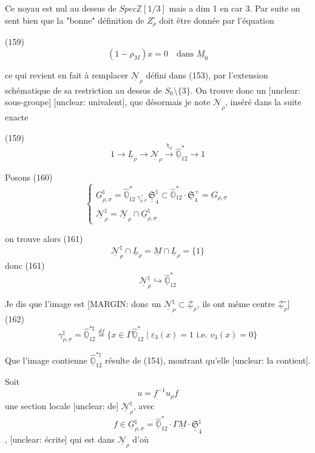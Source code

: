 Ce noyau est nul au dessus de $Spec \mathbb{Z}[1/3]$ mais a dim 1 en car 3. Par suite on sent bien que la "bonne" définition de $Z_\rho^\circ$ doit être donnée par l'équation

(159) $$(1 - \rho_M) x = 0 \quad \text{dans } \underline{M}_0$$

\newpage


ce qui revient en fait à remplacer
$\underline{\mathcal{N}}_{\rho}$ défini dans (153), par l'extension
schématique de sa restriction au dessus
de $S_0 \setminus \{3\}$. On trouve donc un
[unclear: sous-groupe] [unclear: univalent], que désormais
je note $\underline{\mathcal{N}}_{\rho}$, inséré dans la suite exacte

(159) $$1 \to \underline{L}_{\rho} \to \underline{\mathcal{N}}_{\rho} \xrightarrow{\chi_{\rho}} \underline{\hat{\mathbb{O}}}_{12}^* \to 1$$

Posons
(160)
$$ \begin{cases} \underline{G}_{\rho,\sigma}^{\natural} = \underline{\hat{\mathbb{O}}}_{12}^* \underset{\gamma_{\rho,\sigma}}{\cdot} \underline{\underline{\mathfrak{S}}}_{4}^{\natural} \subset \hat{\mathbb{O}}_{12}^* \cdot \underline{\mathfrak{S}}_{4}^{+} = G_{\rho,\sigma} \\ \underline{\mathcal{N}}_{\rho}^{\natural} = \underline{\mathcal{N}}_{\rho} \cap \underline{G}_{\rho,\sigma}^{\natural} \end{cases} $$

on trouve alors
(161) $$\underline{\mathcal{N}}_{\rho}^{\natural} \cap \underline{L}_{\rho} = \underline{M} \cap \underline{L}_{\rho} = \{1\}$$
donc
(161) $$\underline{\mathcal{N}}_{\rho}^{\natural} \hookrightarrow \underline{\hat{\mathbb{O}}}_{12}^*$$

Je dis que l'image est
[MARGIN: donc un $\underline{\mathcal{N}}_{\rho}^{\natural} \subset \underline{\mathcal{Z}}_{\rho}$, ils ont même centre $\underline{\mathcal{Z}}_{\rho}^{\circ}$]
(162) $$\gamma_{\rho,\sigma}^{\natural} = \underline{\hat{\mathbb{O}}}_{12}^{*\natural} \overset{df}{=} \{ x \in \Gamma \underline{\hat{\mathbb{O}}}_{12}^* \mid \varepsilon_3(x) = 1 \text{ i.e. } v_3(x) = 0 \}$$

Que l'image contienne $\underline{\hat{\mathbb{O}}}_{12}^{*\natural}$ résulte
de (154), montrant qu'elle [unclear: la contient].

Soit $$u = f^{-1} u_{\rho} f$$ une section locale [unclear: de] $\underline{\mathcal{N}}_{\rho}^{\natural}$, avec $$f \in \underline{G}_{\rho,\sigma}^{\natural} = \underline{\hat{\mathbb{O}}}_{12}^* \cdot \Gamma \underline{M} \cdot \underline{\underline{\mathfrak{S}}}_{4}^{\natural}$$, [unclear: écrite]
qui est dans $\underline{\mathcal{N}}_{\rho}$ d'où

